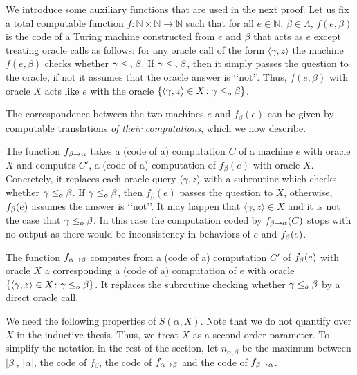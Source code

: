 \documentclass[11pt]{amsart}
\theoremstyle{definition}
\theoremstyle{remark}
\theoremstyle{plain}
\def\la{\langle}
\def\ra{\rangle}
\newcommand{\numberset}{\mathbb}
\newcommand{\N}{\numberset{N}}
\def\a{\alpha}
\def\b{\beta}
\newcommand{\set}[1]{{\{{#1}\}}}
\newcommand{\leqo}{\leq\sb{o}}
\newcommand{\gd}[1]{{\ulcorner{#1}\urcorner}}
\def\N{{\mathbb{N}}}
\begin{document}
We introduce some auxiliary functions that are used in the next proof. 
Let us fix a total computable function $f \colon \N \times \N \to \N$ such that for all $e\in\N$, $\beta \in \Lambda$, $f(e,\beta)$ is the code of a Turing machine constructed from $e$ and $\beta$ that acts as $e$ except treating oracle calls as follows: for any oracle call of the form $\la \gamma,z \ra$ the machine $f(e,\beta)$ checks whether $\gamma\leqo \beta$. 
If $\gamma\leqo\beta$, then it simply passes the question to the oracle, if not it assumes that the oracle answer is \lq\lq not\rq\rq. 
Thus, $f(e,\beta)$ with oracle $X$ acts like $e$ with the oracle $\set{\langle \gamma,z\rangle\in X\colon \gamma\leqo \beta}$.

The correspondence between the two machines $e$ and $f_\beta(e)$ can be given by computable translations {\em of their computations}, which we now describe. 

The function $f\sb{\beta\rightarrow \alpha}$ takes a (code of a) computation $C$ of a machine $e$ with oracle $X$ and computes $C'$, a (code of a) computation of $f_\beta(e)$ with oracle $X$.
Concretely, it replaces each oracle query $\langle \gamma,z\rangle$ with a subroutine which checks whether $\gamma\leqo\beta$. 
If $\gamma\leqo\beta$, then $f_\beta(e)$ passes the question to $X$, otherwise, $f\sb \beta (e)$ assumes the answer is \lq\lq not\rq\rq.
It may happen that $\langle \gamma, z \rangle \in X$ and it is not the case that $\gamma\leqo\beta$. 
In this case the computation coded by $f\sb{\beta\rightarrow \alpha}(C)$ stops with no output as there would be inconsistency in behaviors of $e$ and $f\sb \beta(e)$.  

The function $f\sb{\alpha\rightarrow \beta}$ computes from a (code of a) computation $C'$ of $f\sb \beta(e)$ with oracle $X$ a corresponding a (code of a) computation of $e$ with oracle $\{ \langle \gamma,z\rangle \in X \colon \gamma\leqo\beta\}$. 
It replaces the subroutine checking whether $\gamma\leqo\beta$ by a direct oracle call. 

We need the following properties of $S(\alpha,X)$.
Note that we do not quantify over $X$ in the inductive thesis. 
Thus, we treat $X$ as a second order parameter. 
To simplify the notation in the rest of the section, let $n_{\a,\b}$ be the maximum between $|\beta|$, $|\a|$, the code of $f_\b$, the code of $f\sb{\alpha\rightarrow \beta}$ and the code of $f\sb{\b\rightarrow \a}$.
\end{document}

